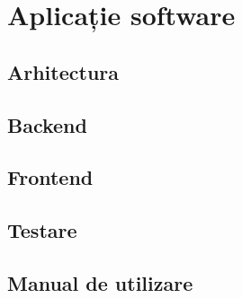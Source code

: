 \chapter{Aplicație software}
\label{chap:ch4}

\section{Arhitectura}
\label{sec:ch4sec1}

\section{Backend}
\label{sec:ch4sec2}

\section{Frontend}
\label{sec:ch4sec3}

\section{Testare}
\label{sec:ch4sec4}

\section{Manual de utilizare}
\label{sec:ch4sec4}